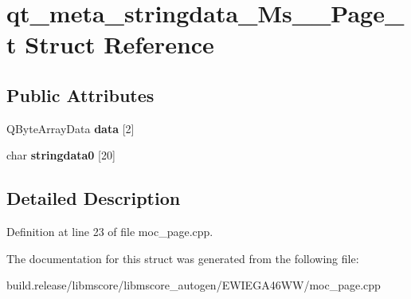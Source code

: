 \hypertarget{structqt__meta__stringdata___ms_____page__t}{}\section{qt\+\_\+meta\+\_\+stringdata\+\_\+\+Ms\+\_\+\+\_\+\+Page\+\_\+t Struct Reference}
\label{structqt__meta__stringdata___ms_____page__t}
\subsection*{Public Attributes}
\begin{DoxyCompactItemize}
\item 
\mbox{\label{structqt__meta__stringdata___ms_____page__t_af87e2dcbcabe7776623ffc6ec5196e76}} 
Q\+Byte\+Array\+Data {\bfseries data} \mbox{[}2\mbox{]}
\item 
\mbox{\label{structqt__meta__stringdata___ms_____page__t_a4a0073b141d576b100bceeda51c44fcb}} 
char {\bfseries stringdata0} \mbox{[}20\mbox{]}
\end{DoxyCompactItemize}


\subsection{Detailed Description}


Definition at line 23 of file moc\+\_\+page.\+cpp.



The documentation for this struct was generated from the following file\+:\begin{DoxyCompactItemize}
\item 
build.\+release/libmscore/libmscore\+\_\+autogen/\+E\+W\+I\+E\+G\+A46\+W\+W/moc\+\_\+page.\+cpp\end{DoxyCompactItemize}
